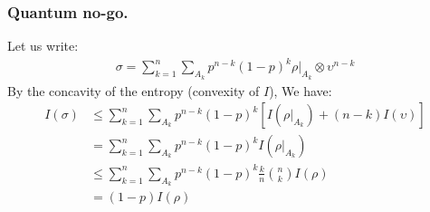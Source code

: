 \documentclass{beamer}
\begin{document}
\begin{frame}
  \frametitle{Quantum no-go.}
Let us write: 
\begin{equation*}
  \begin{split}
    \sigma = \sum^{n}_{k=1}\sum_{A_{k}}p^{n-k}\left( 1 - p  \right)^{k}\rho|_{A_{k}}\otimes \upsilon^{n-k}
  \end{split}
\end{equation*}
By the concavity of the entropy (convexity of $I$), We have:
\begin{equation*}
  \begin{split}
    I\left(\sigma\right) &\le \sum^{n}_{k=1}\sum_{A_{k}}p^{n-k}\left( 1 - p  \right)^{k}\left[ I\left(\rho|_{A_{k}}\right) + (n-k) I(\upsilon) \right] \\ 
    &= \sum^{n}_{k=1}\sum_{A_{k}}p^{n-k}\left( 1 - p  \right)^{k} I\left(\rho|_{A_{k}}\right)  \\ 
    & \le \sum^{n}_{k=1}\sum_{A_{k}}p^{n-k}\left( 1 - p  \right)^{k} \frac{k}{n} { n \choose k } I\left(\rho\right)  \\ 
    & = \left( 1 - p \right)I\left(\rho\right)
  \end{split}
\end{equation*}
\end{frame}
\end{document}
